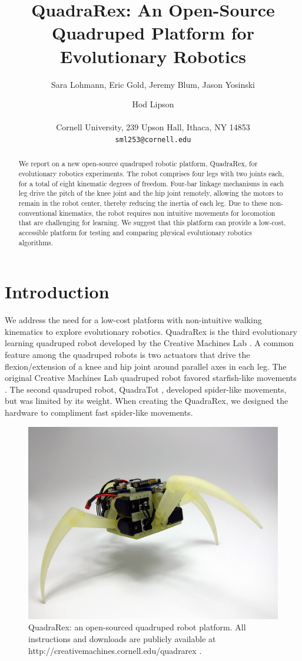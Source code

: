 \documentclass[letterpaper]{article}
\title{QuadraRex: An Open-Source Quadruped Platform for Evolutionary Robotics}
\author{Sara Lohmann, Eric Gold, Jeremy Blum, Jason Yosinski \and Hod Lipson \\
\mbox{}\\
Cornell University, 239 Upson Hall, Ithaca, NY 14853 \\
\texttt{sml253@cornell.edu}}
\begin{document}
\maketitle

\begin{abstract}
We report on a new open-source quadruped robotic platform, QuadraRex, for evolutionary robotics experiments. The robot comprises four legs with two joints each, for a total of eight kinematic degrees of freedom. Four-bar linkage mechanisms in each leg drive the
pitch of the knee joint and the hip joint remotely, allowing the motors to remain in the robot center, thereby reducing the inertia of each leg. Due to these non-conventional kinematics, the robot requires non intuitive movements for locomotion that are challenging for learning. We suggest that this platform can provide a low-cost, accessible platform for testing and comparing physical evolutionary robotics algorithms.
\end{abstract}



\section{Introduction}

We address the need for a low-cost platform with non-intuitive walking kinematics to explore evolutionary robotics. QuadraRex is the third evolutionary learning quadruped robot developed by the Creative Machines Lab \citep{HL, JY}. A common feature among the quadruped robots is two actuators that drive the flexion/extension of a knee and hip joint around parallel axes in each leg. The original Creative Machines Lab quadruped robot favored starfish-like movements \citep{HL}. The second quadruped robot, QuadraTot \citep{JY}, developed spider-like movements, but was limited by its weight. When creating the QuadraRex, we designed the hardware to compliment fast spider-like movements.

\begin{figure}[t]
\begin{center}
\includegraphics[width=.45\textwidth]{fig1.jpg}
\caption{QuadraRex: an open-sourced quadruped robot platform. All instructions and downloads are publicly available at http://creativemachines.cornell.edu/quadrarex \citep{WEB}.}
\label{fig1}
\end{center}
\end{figure}
\end{document}
